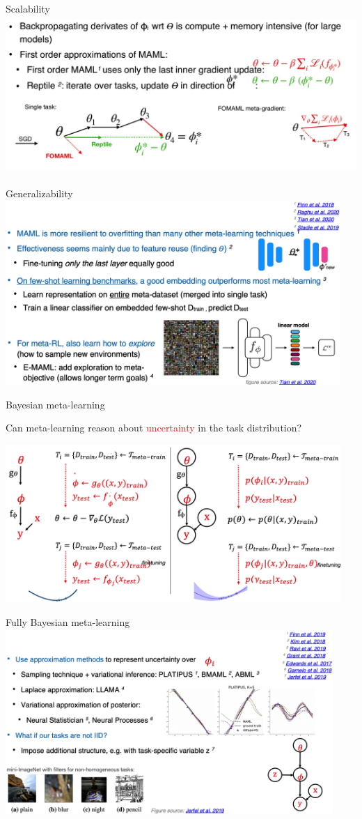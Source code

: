 \begin{frame}{Scalability}
    \centering\includegraphics[height=6cm]{image/img010316.jpg}
\end{frame}
\begin{frame}{Generalizability}
    \centering\includegraphics[height=7cm]{image/img010613.jpg}
\end{frame}
\begin{frame}{Bayesian meta-learning}
    \centerline{Can meta-learning reason about \textcolor{red}{uncertainty} in the task distribution?}
    \centering\includegraphics[height=6cm]{image/img010856.jpg}
\end{frame}
\begin{frame}{Fully Bayesian meta-learning}
    \centering\includegraphics[height=7cm]{image/img011307.jpg}
\end{frame}
